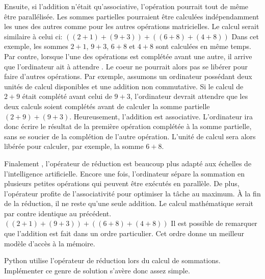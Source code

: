 \documentclass[letterpaper,10pt,french]{sphinxmanual}
\begin{document}
Ensuite, si l’addition n’était qu’associative, l’opération pourrait tout de même être parallélisée. Les sommes partielles pourraient être calculées indépendamment les unes des autres comme pour les autres opérations matricielles. Le calcul serait similaire à celui ci:
\(((2+1)+(9+3))+((6+8)+(4+8))\)
Dans cet exemple, les sommes \(2+1\), \(9+3\), \(6+8\) et \(4+8\) sont calculées en même temps. Par contre, lorsque l’une des opérations est complétée avant une autre, il arrive que l’ordinateur ait à attendre . Le coeur ne pourrait alors pas se libérer pour faire d’autres opérations. Par exemple, assumons un ordinateur possédant deux unités de calcul disponibles et une addition non commutative. Si le calcul de \(2+9\) était complété avant celui de \(9+3\), l’ordinateur devrait attendre que les deux calculs soient complétés avant de calculer la somme partielle \((2+9)+(9+3)\). Heureusement, l’addition est associative. L’ordinateur ira donc écrire le résultat de la première opération complétée à la somme partielle, sans se soucier de la complétion de l’autre opération. L’unité de calcul sera alors libérée pour calculer, par exemple, la somme \(6+8\).

Finalement , l’opérateur de réduction est beaucoup plus adapté aux échelles de l’intelligence artificielle. Encore une fois, l’ordinateur sépare la sommation en plusieurs petites opérations qui peuvent être exécutés en parallèle. De plus, l’opérateur profite de l’associativité pour optimiser la tâche au maximum. À la fin de la réduction, il ne reste qu’une seule addition. Le calcul mathématique serait par contre identique au précédent.
\(((2+1)+(9+3))+((6+8)+(4+8))\)
Il est possible de remarquer que l’addition est fait dans un ordre particulier. Cet ordre donne un meilleur modèle d’accès à la mémoire.

Python utilise l’opérateur de réduction lors du calcul de sommations. Implémenter ce genre de solution s’avère donc assez simple.

\begin{sphinxVerbatim}[commandchars=\\\{\}]
  \PYG{p}{[}\PYG{p}{]}
  
\end{sphinxVerbatim}
\end{document}
